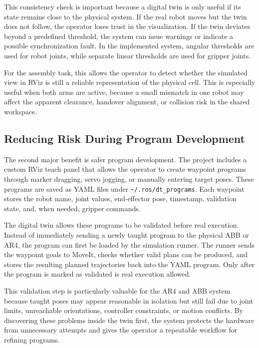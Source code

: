 This consistency check is important because a digital twin is only useful if its state remains close to the physical system. If the real robot moves but the twin does not follow, the operator loses trust in the visualization. If the twin deviates beyond a predefined threshold, the system can issue warnings or indicate a possible synchronization fault. In the implemented system, angular thresholds are used for robot joints, while separate linear thresholds are used for gripper joints.

For the assembly task, this allows the operator to detect whether the simulated view in RViz is still a reliable representation of the physical cell. This is especially useful when both arms are active, because a small mismatch in one robot may affect the apparent clearance, handover alignment, or collision risk in the shared workspace.

\subsection{Reducing Risk During Program Development}

The second major benefit is safer program development. The project includes a custom RViz teach panel that allows the operator to create waypoint programs through marker dragging, servo jogging, or manually entering target poses. These programs are saved as YAML files under \texttt{\textasciitilde/.ros/dt\_programs}. Each waypoint stores the robot name, joint values, end-effector pose, timestamp, validation state, and, when needed, gripper commands.

The digital twin allows these programs to be validated before real execution. Instead of immediately sending a newly taught program to the physical ABB or AR4, the program can first be loaded by the simulation runner. The runner sends the waypoint goals to MoveIt, checks whether valid plans can be produced, and stores the resulting planned trajectories back into the YAML program. Only after the program is marked as validated is real execution allowed.

This validation step is particularly valuable for the AR4 and ABB system because taught poses may appear reasonable in isolation but still fail due to joint limits, unreachable orientations, controller constraints, or motion conflicts. By discovering these problems inside the twin first, the system protects the hardware from unnecessary attempts and gives the operator a repeatable workflow for refining programs.

